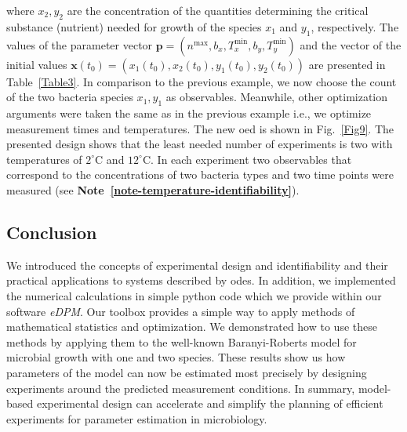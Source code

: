 \documentclass[graybox]{svmult}
\newcommand{\mbx}{\mathbf{x}}
\newcommand{\mbp}{\mathbf{p}}
\begin{document}
where $x_2, y_2$ are the concentration of the quantities determining the critical substance (nutrient) needed for growth of the species $x_1$ and $y_1$, respectively.
The values of the parameter vector $\mbp = (n^\text{max}, b_x, T^\text{min}_x, b_y, T^\text{min}_y)$ and the vector of the initial values $\mbx(t_0)=(x_1(t_0), x_2(t_0), y_1(t_0), y_2(t_0))$ are presented in Table~\ref{Table3}.
%
In comparison to the previous example, we now choose the count of the two bacteria species $x_1,y_1$ as observables.
Meanwhile, other optimization arguments were taken the same as in the previous example i.e., we optimize measurement times and temperatures.
The new \ac{oed} is shown in Fig.~\ref{Fig9}.
%
%
The presented design shows that the least needed number of experiments is two with temperatures of $2^\circ$C and $12^\circ$C.
In each experiment two observables that correspond to the concentrations of two bacteria types and two time points were measured (see \textbf{Note~\ref{note-temperature-identifiability}}).
%
%
%
\subsection{Conclusion}
We introduced the concepts of experimental design and identifiability and their practical applications to systems described by \acp{ode}.
In addition, we implemented the numerical calculations in simple python code which we provide within our software {\it eDPM}.
Our toolbox provides a simple way to apply methods of mathematical statistics and optimization.
We demonstrated how to use these methods by applying them to the well-known Baranyi-Roberts model for microbial growth with one and two species.
These results show us how parameters of the model can now be estimated most precisely by designing experiments around the predicted measurement conditions.
In summary, model-based experimental design can accelerate and simplify the planning of efficient experiments for parameter estimation in microbiology.
\end{document}
